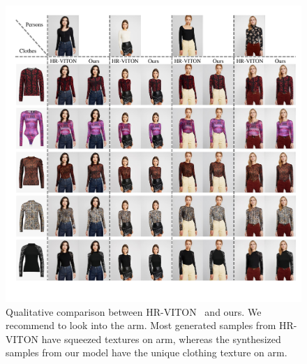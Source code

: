 \begin{figure}[t!]
    \centering
     \includegraphics[width=\textwidth]{fig_supp/fig_supp_longsleeve.pdf}
     \caption{Qualitative comparison between HR-VITON~\cite{lee2022hrviton} and ours. We recommend to look into the arm. Most generated samples from HR-VITON have squeezed textures on arm, whereas the synthesized samples from our model have the unique clothing texture on arm.
     }
     \label{fig_supp_longsleeve}
\end{figure}


